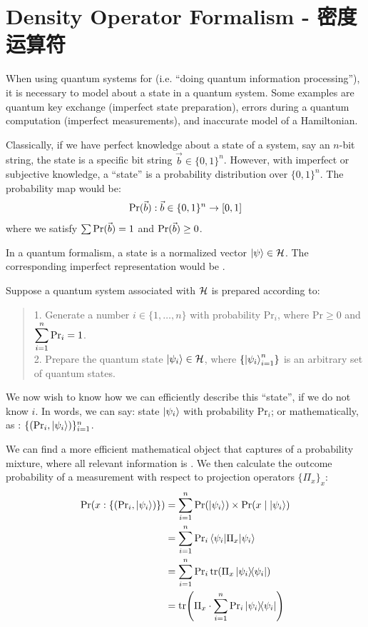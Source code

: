 \section{Density Operator Formalism - 密度运算符}
When using quantum systems for  (i.e. ``doing quantum information processing''), it is necessary to model  about a state in a quantum system. Some examples are quantum key exchange (imperfect state preparation), errors during a quantum computation (imperfect measurements), and inaccurate model of a Hamiltonian. \par
Classically, if we have perfect knowledge about a state of a system, say an $n$-bit string, the state is a specific bit string $\vec{b} \in \{0, 1\}^n$. However, with imperfect or subjective knowledge, a ``state'' is a probability distribution over $\{0, 1\}^n$. The probability map would be:
$$\text{Pr}(\vec{b}): \vec{b} \in \{0, 1\}^n \to [0,1]$$
where we satisfy $\sum \text{Pr}(\vec{b}) = 1$ and $\text{Pr}(\vec{b}) \ge 0$. \par
In a quantum formalism, a state is a normalized vector $\ket{\psi} \in \mathcal{H}$. The corresponding imperfect representation would be . \par
Suppose a quantum system associated with $\mathcal{H}$ is prepared according to:
\begin{quote}
    1. Generate a number $i \in \{1, \dots, n\}$ with probability $\text{Pr}_i$, where $\text{Pr} \ge 0$ and $\displaystyle \sum_{i = 1}^{n} \text{Pr}_i = 1$. \\
    2. Prepare the quantum state $\ket{\psi_i} \in \mathcal{H}$, where $\{\ket{\psi_i}_{i = 1}^n\}$ is an arbitrary set of quantum states.
\end{quote}
We now wish to know how we can efficiently describe this ``state'', if we do not know $i$. In words, we can say: state $\ket{\psi_i}$ with probability $\text{Pr}_i$; or mathematically, as : $\{(\text{Pr}_i, \ket{\psi_i})\}_{i=1}^n$. \par
We can find a more efficient mathematical object that captures  of a probability mixture, where all relevant information is . We then calculate the outcome probability of a measurement with respect to projection operators $\{\Pi_x\}_x$:
\begin{align*}
    \Prob{x: \{(\text{Pr}_i, \ket{\psi_i})\}} &= \Sum{i = 1}{n} \Prob{\ket{\psi_i}} \times \Prob{x \mid \ket{\psi_i}} \\
    &= \Sum{i=1}{n} \text{Pr}_i \ev{\Pi_x}{\psi_i} \\
    &= \Sum{i=1}{n} \text{Pr}_i \tr(\Pi_x \dyad{\psi_i}) \\
    &= \tr(\Pi_x \cdot \Sum{i=1}{n} \text{Pr}_i \dyad{\psi_i})
\end{align*}
